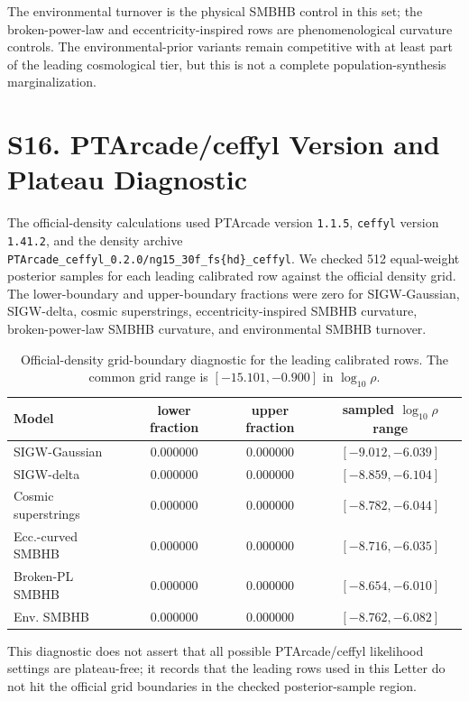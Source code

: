 \documentclass[aps,prl,superscriptaddress,nofootinbib]{revtex4-2}
\begin{document}
The environmental turnover is the physical SMBHB control in this set; the
broken-power-law and eccentricity-inspired rows are phenomenological curvature
controls.  The environmental-prior variants remain competitive with at least
part of the leading cosmological tier, but this is not a complete
population-synthesis marginalization.

\section*{S16. PTArcade/ceffyl Version and Plateau Diagnostic}

The official-density calculations used PTArcade version \texttt{1.1.5},
\texttt{ceffyl} version \texttt{1.41.2}, and the density archive
\texttt{PTArcade\_ceffyl\_0.2.0/ng15\_30f\_fs\{hd\}\_ceffyl}.  We checked
512 equal-weight posterior samples for each leading calibrated row against the
official density grid.  The lower-boundary and upper-boundary fractions were
zero for SIGW-Gaussian, SIGW-delta, cosmic superstrings, eccentricity-inspired
SMBHB curvature, broken-power-law SMBHB curvature, and environmental SMBHB
turnover.

\begin{table}[H]
\caption{\label{tab:plateau}Official-density grid-boundary diagnostic for the
leading calibrated rows.  The common grid range is
$[-15.101,-0.900]$ in $\log_{10}\rho$.}
\begin{ruledtabular}
\begin{tabular}{lccc}
Model & lower fraction & upper fraction & sampled $\log_{10}\rho$ range \\
\hline
SIGW-Gaussian & $0.000000$ & $0.000000$ & $[-9.012,-6.039]$ \\
SIGW-delta & $0.000000$ & $0.000000$ & $[-8.859,-6.104]$ \\
Cosmic superstrings & $0.000000$ & $0.000000$ & $[-8.782,-6.044]$ \\
Ecc.-curved SMBHB & $0.000000$ & $0.000000$ & $[-8.716,-6.035]$ \\
Broken-PL SMBHB & $0.000000$ & $0.000000$ & $[-8.654,-6.010]$ \\
Env. SMBHB & $0.000000$ & $0.000000$ & $[-8.762,-6.082]$ \\
\end{tabular}
\end{ruledtabular}
\end{table}

This diagnostic does not assert that all possible PTArcade/ceffyl likelihood
settings are plateau-free; it records that the leading rows used in this
Letter do not hit the official grid boundaries in the checked posterior-sample
region.
\end{document}
